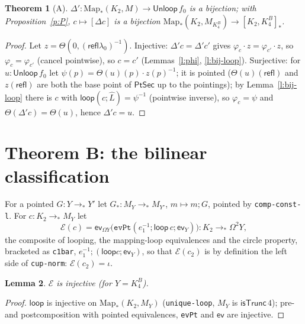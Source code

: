 \documentclass[11pt]{amsart}
\newtheorem{theorem}{Theorem}
\newtheorem{lemma}[theorem]{Lemma}
\theoremstyle{definition}
\theoremstyle{remark}
\newcommand{\Om}{\Omega}
\newcommand{\Map}{\mathrm{Map}_*}
\newcommand{\code}[1]{\texttt{#1}}
\newcommand{\cT}{\mathsf{isTrunc}}
\newcommand{\refl}{\mathsf{refl}}
\newcommand{\ev}{\mathsf{ev}}
\newcommand{\lp}{\mathsf{loop}}
\newcommand{\hc}[2]{[#1,#2]_*}
\newcommand{\Unl}{\mathsf{Unloop}}
\begin{document}
\begin{theorem}[A]\label{t:A}
$\Delta':\Map(K_2,M)\to\Unl\,f_0$ is a bijection; with
Proposition~\ref{p:P}, $c\mapsto[\Delta c]$ is a bijection
$\Map(K_2,M_{K^B_4})\to\hc{K_2}{K^B_4}$.
\end{theorem}
\begin{proof}
Let $z=\Theta(0,(\refl\lambda_0)^{-1})$. Injective: $\Delta'c=\Delta'c'$ gives
$\varphi_c\cdot z=\varphi_{c'}\cdot z$, so $\varphi_c=\varphi_{c'}$
(cancel pointwise), so $c=c'$ (Lemmas~\ref{l:phi}, \ref{l:bij-loop}).
Surjective: for $u:\Unl\,f_0$ let $\psi(p)=\Theta(u)(p)\cdot z(p)^{-1}$; it
is pointed ($\Theta(u)(\refl)$ and $z(\refl)$ are both the base point of
$\mathsf{PtSec}$ up to the pointings); by Lemma~\ref{l:bij-loop} there is
$c$ with $\lp(c;\hat L)=\psi^{-1}$ (pointwise inverse), so
$\varphi_c=\psi$ and $\Theta(\Delta'c)=\Theta(u)$, hence $\Delta'c=u$.
\end{proof}

\section{Theorem B: the bilinear classification}\label{sec:B}

For a pointed $G:Y\to_*Y'$ let $G_*:M_Y\to_*M_{Y'}$, $m\mapsto m;G$,
pointed by \code{comp-const-l}. For $c:K_2\to_*M_Y$ let
\[\mathcal E(c)=\ev_{\Om Y}\bigl(\code{evPt}(e_1^{-1};\lp\,c;\ev_Y)\bigr):K_2\to_*\Om^2Y,\]
the composite of looping, the mapping-loop equivalences and the circle
property, bracketed as \code{c1bar}, $e_1^{-1};(\lp c;\ev_Y)$, so that $\mathcal E(c_2)$
is by definition the left side of \code{cup-norm}: $\mathcal E(c_2)=\iota$.

\begin{lemma}\label{l:E-inj}
$\mathcal E$ is injective (for $Y=K^B_4$).
\end{lemma}
\begin{proof}
$\lp$ is injective on $\Map(K_2,M_Y)$ (\code{unique-loop}, $M_Y$ is
$\cT\,4$); pre- and postcomposition with pointed equivalences, \code{evPt}
and $\ev$ are injective.
\end{proof}
\end{document}
